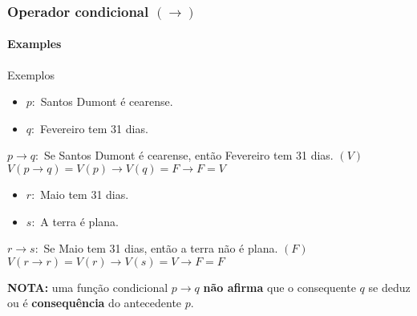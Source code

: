 \begin{frame}[t]
    \frametitle{Operador condicional $(\rightarrow)$ }
    \framesubtitle{Examples}
    \small
    \begin{exampleblock}{Exemplos}
        \begin{itemize}
            \item[] $p:$ Santos Dumont é cearense.
            \item[] $q:$ Fevereiro tem 31 dias.
        \end{itemize}
        $p \rightarrow q:$ Se Santos Dumont é cearense, então Fevereiro tem 31 dias. $(V)$ \\[2pt]
        $V(p \rightarrow q) = V(p) \rightarrow V(q) = F \rightarrow F = V$
    \end{exampleblock}
    \vspace{-2mm}
    \begin{exampleblock}{}
        \begin{itemize}
            \item[] $r:$ Maio tem 31 dias.
            \item[] $s:$ A terra é plana. 
        \end{itemize}
        $r \rightarrow s:$ Se Maio tem 31 dias, então a terra não é plana. $(F)$ \\[2pt]
        $V(r \rightarrow r) = V(r) \rightarrow V(s) = V \rightarrow F = F$
    \end{exampleblock}
    \vspace{-2mm}
    \begin{alertblock}{}
        \textbf{NOTA:} uma função condicional $p \rightarrow q$ \textbf{não afirma} que o consequente $q$ se deduz ou é \textbf{consequência} do antecedente $p$.
    \end{alertblock}
\end{frame}
%

